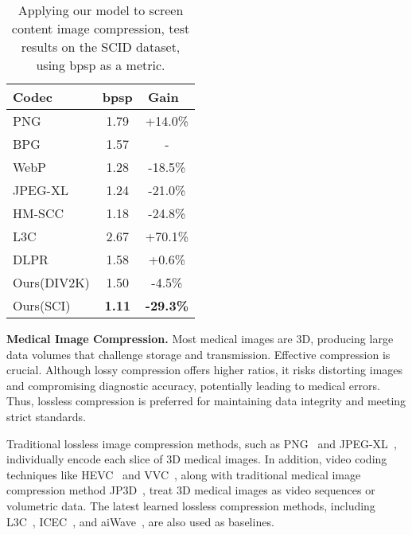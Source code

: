 \begin{table}[t]
    \centering
    \tabcolsep=0.3cm
        \begin{tabular}{lcc}
            \toprule[2pt]
            Codec &bpsp &Gain\ \\
            \midrule[1pt]
            PNG~\cite{boutell1997png} &1.79 &+14.0\%\\
            BPG~\cite{bpg}  &1.57 &-\\
            WebP~\cite{webp_tech_report} &1.28 &-18.5\%\\
            JPEG-XL~\cite{alakuijala2019jpeg} &1.24 &-21.0\%\\
            HM-SCC~\cite{7265040} &1.18 &-24.8\%\\
            L3C~\cite{mentzer2019practical} &2.67 &+70.1\%\\
            DLPR~\cite{bai2024deep} &1.58 &+0.6\%\\
            \midrule[1pt]
            Ours(DIV2K) &1.50 &-4.5\%\\
            Ours(SCI) &\bf1.11 &\bf-29.3\%\\
            \bottomrule[2pt]
        \end{tabular}
        \caption{Applying our model to screen content image compression, test results on the SCID dataset, using bpsp as a metric.}
        \label{scc-results}
\end{table}


\textbf{Medical Image Compression.}
Most medical images are 3D, producing large data volumes that challenge storage and transmission. Effective compression is crucial. Although lossy compression offers higher ratios, it risks distorting images and compromising diagnostic accuracy, potentially leading to medical errors. Thus, lossless compression is preferred for maintaining data integrity and meeting strict standards.

Traditional lossless image compression methods, such as PNG~\cite{boutell1997png} and JPEG-XL~\cite{alakuijala2019jpeg}, individually encode each slice of 3D medical images. In addition, video coding techniques like HEVC~\cite{sullivan2012overview} and VVC~\cite{Bross_2021_TCSVT_VVC}, along with traditional medical image compression method JP3D~\cite{bruylants2009jp3d}, treat 3D medical images as video sequences or volumetric data. The latest learned lossless compression methods, including L3C~\cite{mentzer2019practical}, ICEC~\cite{chen2022exploiting}, and aiWave~\cite{xue2022aiwave}, are also used as baselines.

